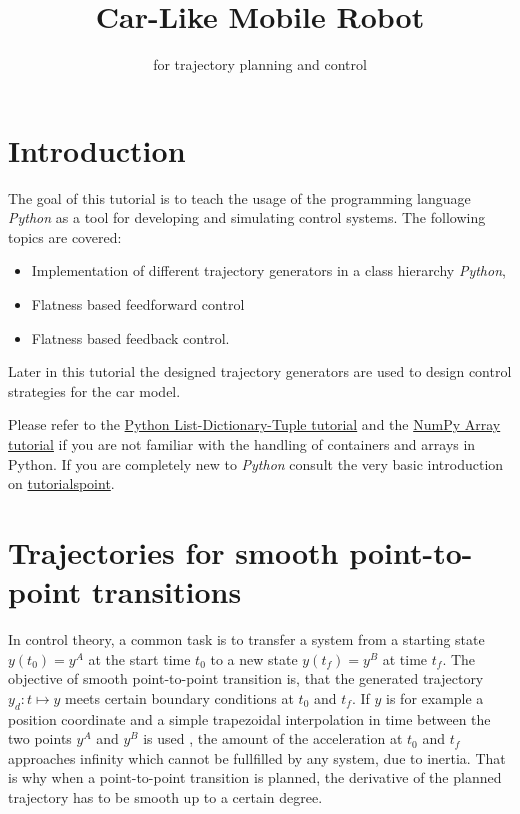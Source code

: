 \documentclass[a4paper,11pt,headings=standardclasses,parskip=half]{scrartcl}
\title{Car-Like Mobile Robot}
\subtitle{\py for trajectory planning and control}%
\author{}
\date{}
\newcommand{\py}{\emph{Python}\xspace}
\begin{document}
\maketitle%

\tableofcontents

\newpage

\section{Introduction}
The goal of this tutorial is to teach the usage of the programming language \py as a tool for developing and simulating control systems. The following topics are covered:
\begin{itemize}
\item Implementation of different trajectory generators in a class hierarchy \py,
\item Flatness based feedforward control
\item Flatness based feedback control.

\end{itemize}

Later in this tutorial the designed trajectory generators are used to design control strategies for the car model. 

Please refer to the \href{http://cs231n.github.io/python-numpy-tutorial/#python-containers}{Python List-Dictionary-Tuple tutorial} and the \href{http://cs231n.github.io/python-numpy-tutorial/#numpy}{NumPy Array tutorial} if you are not familiar with the handling of containers and arrays in Python. If you are completely new to \py consult the very basic introduction on \href{https://www.tutorialspoint.com/python/index.htm}{tutorialspoint}.
\section{Trajectories for smooth point-to-point transitions}
In control theory, a common task is to transfer a system from a starting state $y(t_0)=y^A$ at the start time $t_0$ to a new state $y(t_f)=y^B$ at time $t_f$. The objective of smooth point-to-point transition is, that the generated trajectory $y_d: t \mapsto y$ meets certain boundary conditions at $t_0$ and $t_f$. If $y$ is for example a position coordinate and a simple trapezoidal interpolation in time between the two points $y^A$ and $y^B$ is used , the amount of the acceleration at $t_0$ and $t_f$ approaches infinity which cannot be fullfilled by any system, due to inertia. That is why when a point-to-point transition is planned, the derivative of the planned trajectory has to be smooth up to a certain degree. 
\end{document}
